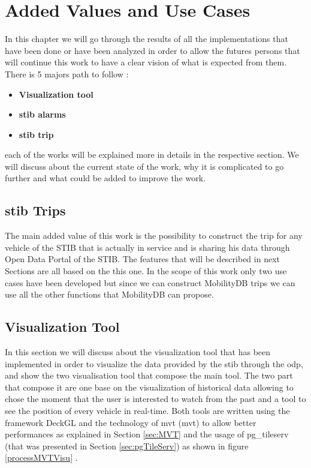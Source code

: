 \documentclass[12pt]{report}
\begin{document}
	\chapter{Added Values and Use Cases}
	
	In this chapter we will go through the results of all the implementations that have been done or have been analyzed in order to allow the futures persons that will continue this work to have a clear vision of what is expected from them. There is 5 majors path to follow : 
	
	\begin{itemize}[noitemsep]
		\item \textbf{Visualization tool}
		\item \textbf{\acrshort{stib} alarms}
		\item \textbf{\acrshort{stib} trip}
	\end{itemize}
	
	each of the works will be explained more in details in the respective section. We will discuss about the current state of the work, why it is complicated to go further and what could be added to improve the work.
	
	\section{\acrshort{stib} Trips}
	
	The main added value of  this work is the possibility to construct the trip for any vehicle of the STIB that is actually in service and is sharing  his data through Open Data Portal of the STIB. The features that will be described in next Sections are all based on the this one. In the scope of this work only two use cases have been developed but since we can construct MobilityDB trips we can use all the other functions that MobilityDB can propose.
	
	 
	
	
	
	\section{Visualization Tool}
	
	In this section we will discuss about the visualization tool that has been implemented in order to visualize the data provided by the \acrshort{stib} through the \acrshort{odp}, and show the two visualisation tool that compose the main tool. The two part that compose it are  one base on the visualization of historical  data allowing to chose the moment that the user is interested to watch from the past and a tool to see the position of every vehicle in real-time. Both tools are written using the framework DeckGL and the technology of \acrlong{mvt} (\acrshort{mvt}) to allow better performances as explained in Section \ref{sec:MVT} and the usage of pg\_tileserv (that was presented in Section \ref{sec:pgTileServ}) as shown in figure \ref{processMVTVisu} .
	
\end{document}
